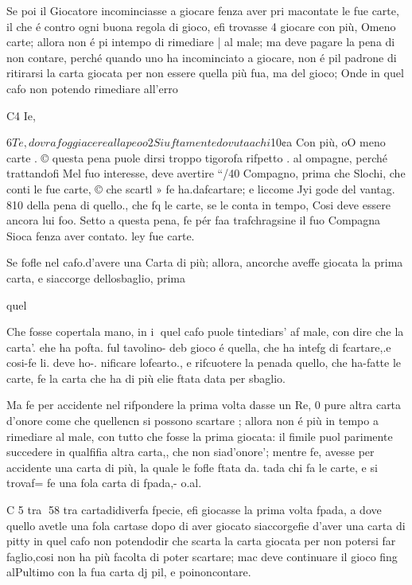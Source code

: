 \documentclass[12pt,a6paper]{article}
\begin{document}
Se poi il Giocatore incominciasse a giocare fenza aver pri
macontate le fue carte, il che
é contro ogni buona regola di
gioco, efi trovasse 4 giocare
con più, Omeno carte; allora
non é pi intempo di rimediare |
al male; ma deve pagare la
pena di non contare, perché
quando uno ha incominciato a
giocare, non é pil padrone di
ritirarsi la carta giocata per
non essere quella più fua, ma
del gioco; Onde in quel cafo
non potendo rimediare all’erro

C4 Ie,

 

 

 

 

 
$6

Te, dovra foggiacere alla peoo

2 Siuftamente dovuta a chi
$10¢a Con più, oO meno carte .
© questa pena puole dirsi
troppo tigorofa rifpetto . al
ompagne, perché trattandofi
Mel fuo interesse, deve avertire
“/40 Compagno, prima che
Slochi, che conti le fue carte,
© che scartl » fe ha.dafcartare;
e liccome Jyi gode del vantag.
810 della pena di quello., che fq
le carte, se le conta in tempo,
Cosi deve essere ancora lui foo.
Setto a questa pena, fe pér faa
trafchragsine il fuo Compagna
Sioca fenza aver contato. ley
fue carte.

Se fofle nel cafo.d’avere una
Carta di più; allora, ancorche
aveffe giocata la prima carta,
e siaccorge dellosbaglio, prima

quel

Che fosse copertala mano, in i
quel cafo puole tintediars’ af
male, con dire che la carta’.
ehe ha pofta. ful tavolino- deb
gioco é quella, che ha intefg
di fcartare,.e cosi-fe li. deve ho-.
nificare lofearto., e rifcuotere
la penada quello, che ha-fatte
le carte, fe la carta che ha di
più elie ftata data per sbaglio.

Ma fe per accidente nel rifpondere la prima volta dasse un
Re, 0 pure altra carta d’onore
come che quellencn si possono scartare ; allora non é più in
tempo a rimediare al male, con
tutto che fosse la prima giocata:
il fimile puol parimente succedere in qualfifia altra carta,,
che non siad’onore’; mentre fe,
avesse per accidente una carta
di più, la quale le fofle ftata da.
tada chi fa le carte, e si trovaf=
fe una fola carta di fpada,- o.al.

C 5 tra
58
tra cartadidiverfa fpecie, efi
giocasse la prima volta fpada, a
dove quello avetle una fola cartase dopo di aver giocato siaccorgefie d’aver una carta di pitty
in quel cafo non potendodir che
scarta la carta giocata per non
potersi far faglio,cosi non ha più
facolta di poter scartare; mac
deve continuare il gioco fing
alPultimo con la fua carta dj
pil, e poinoncontare.
\end{document}
